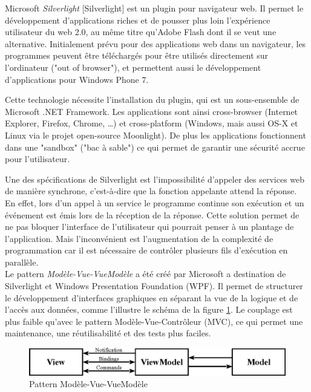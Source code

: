 \label{Silverlight}

Microsoft \textit{Silverlight} [Silverlight] est un plugin pour navigateur web.
Il permet le développement d'applications riches et de pousser plus loin l'expérience utilisateur du web 2.0, au même titre qu'Adobe Flash dont il se veut une alternative.
Initialement prévu pour des applications web dans un navigateur, les programmes peuvent être téléchargés pour être utilisés directement sur l'ordinateur ("out of browser"), et permettent aussi le développement d'applications pour Windows Phone 7.

Cette technologie nécessite l'installation du plugin, qui est un sous-ensemble de Microsoft .NET Framework.
Les applications sont ainsi cross-browser (Internet Explorer, Firefox, Chrome, \ldots) et cross-platform (Windows, mais aussi OS-X et Linux via le projet open-source Moonlight).
De plus les applications fonctionnent dans une "sandbox" ("bac à sable") ce qui permet de garantir une sécurité accrue pour l'utilisateur.

Une des spécifications de Silverlight est l'impossibilité d'appeler des services web de manière synchrone, c'est-à-dire que la fonction appelante attend la réponse.
En effet, lors d'un appel à un service le programme continue son exécution et un événement est émis lors de la réception de la réponse.
Cette solution permet de ne pas bloquer l'interface de l'utilisateur qui pourrait penser à un plantage de l'application.
Mais l'inconvénient est l'augmentation de la complexité de programmation car il est nécessaire de contrôler plusieurs fils d'exécution en parallèle.
\\

Le pattern \textit{Modèle-Vue-VueModèle} a été créé par Microsoft a destination de Silverlight et Windows Presentation Foundation (WPF).
Il permet de structurer le développement d'interfaces graphiques en séparant la vue de la logique et de l'accès aux données, comme l'illustre le schéma de la figure \ref{MVVM}.
Le couplage est plus faible qu'avec le pattern Modèle-Vue-Contrôleur (MVC), ce qui permet une maintenance, une réutilisabilité et des tests plus faciles.
\begin{figure}[!h]
	\center
	\includegraphics[width=1\textwidth]{img/MVVM.png}
	\caption{Pattern Modèle-Vue-VueModèle}
	\label{MVVM}
\end{figure}
~~\\

